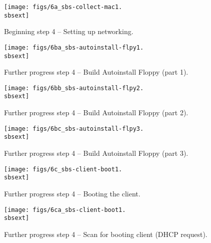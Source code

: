 
\begin{figure}[htbp]
  \begin{center}
    \texttt{[image: figs/6a\_sbs-collect-mac1.\\sbsext]}
    \caption{Beginning step 4 -- Setting up networking.}
    \label{fig:sbs-setup-network1}
  \end{center}
\end{figure}



\begin{figure}[htbp]
  \begin{center}
    \texttt{[image: figs/6ba\_sbs-autoinstall-flpy1.\\sbsext]}
    \caption{Further progress step 4 -- Build Autoinstall Floppy (part 1).}
    \label{fig:sbs-autoinstall-flpy1}
  \end{center}
\end{figure}

\begin{figure}[htbp]
  \begin{center}
    \texttt{[image: figs/6bb\_sbs-autoinstall-flpy2.\\sbsext]}
    \caption{Further progress step 4 -- Build Autoinstall Floppy (part 2).}
    \label{fig:sbs-autoinstall-flpy2}
  \end{center}
\end{figure}


\begin{figure}[htbp]
  \begin{center}
    \texttt{[image: figs/6bc\_sbs-autoinstall-flpy3.\\sbsext]}
    \caption{Further progress step 4 -- Build Autoinstall Floppy (part 3).}
    \label{fig:sbs-autoinstall-flpy3}
  \end{center}
\end{figure}

\begin{figure}[htbp]
  \begin{center}
    \texttt{[image: figs/6c\_sbs-client-boot1.\\sbsext]}
    \caption{Further progress step 4 -- Booting the client.}
    \label{fig:sbs-collect-boot1}
  \end{center}
\end{figure}

\clearpage

\begin{figure}[htbp]
  \begin{center}
    \texttt{[image: figs/6ca\_sbs-client-boot1.\\sbsext]}
    \caption{Further progress step 4 -- Scan for booting client (DHCP request).}
    \label{fig:sbs-client-boot2}
  \end{center}
\end{figure}

